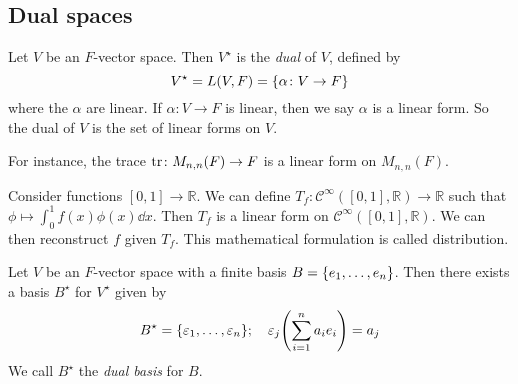 \subsection{Dual spaces}
\begin{definition}
	Let \( V \) be an \( F \)-vector space.
	Then \( V^\star \) is the \textit{dual} of \( V \), defined by
	\[
		V^\star = L(V,F) = \qty{\alpha \colon V \to F}
	\]
	where the \( \alpha \) are linear.
	If \( \alpha \colon V \to F \) is linear, then we say \( \alpha \) is a linear form.
	So the dual of \( V \) is the set of linear forms on \( V \).
\end{definition}
\begin{example}
	For instance, the trace \( \tr \colon M_{n,n}(F) \to F \) is a linear form on \( M_{n,n}(F) \).
\end{example}
\begin{example}
	Consider functions \( [0,1] \to \mathbb R \).
	We can define \( T_f \colon \mathcal C^\infty([0,1], \mathbb R) \to \mathbb R \) such that \( \phi \mapsto \int_0^1 f(x) \phi(x) \dd{x} \).
	Then \( T_f \) is a linear form on \( \mathcal C^{\infty}([0,1], \mathbb R) \).
	We can then reconstruct \( f \) given \( T_f \).
	This mathematical formulation is called distribution.
\end{example}
\begin{lemma}
	Let \( V \) be an \( F \)-vector space with a finite basis \( B = \qty{e_1, \dots, e_n} \).
	Then there exists a basis \( B^\star \) for \( V^\star \) given by
	\[
		B^\star = \qty{\varepsilon_1, \dots, \varepsilon_n}; \quad \varepsilon_j \qty( \sum_{i=1}^n a_i e_i ) = a_j
	\]
	We call \( B^\star \) the \textit{dual basis} for \( B \).
\end{lemma}
